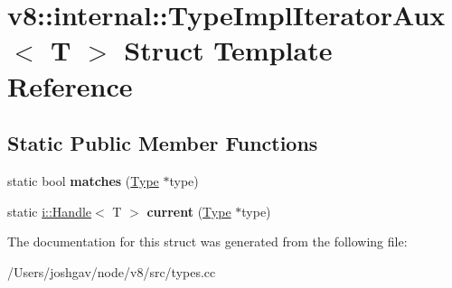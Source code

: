 \hypertarget{structv8_1_1internal_1_1_type_impl_iterator_aux}{}\section{v8\+:\+:internal\+:\+:Type\+Impl\+Iterator\+Aux$<$ T $>$ Struct Template Reference}
\label{structv8_1_1internal_1_1_type_impl_iterator_aux}
\subsection*{Static Public Member Functions}
\begin{DoxyCompactItemize}
\item 
static bool {\bfseries matches} (\hyperlink{classv8_1_1internal_1_1_type}{Type} $\ast$type)\hypertarget{structv8_1_1internal_1_1_type_impl_iterator_aux_a26e498899ff3d0c8dcfd25aaa6b6c1ac}{}\label{structv8_1_1internal_1_1_type_impl_iterator_aux_a26e498899ff3d0c8dcfd25aaa6b6c1ac}

\item 
static \hyperlink{classv8_1_1internal_1_1_handle}{i\+::\+Handle}$<$ T $>$ {\bfseries current} (\hyperlink{classv8_1_1internal_1_1_type}{Type} $\ast$type)\hypertarget{structv8_1_1internal_1_1_type_impl_iterator_aux_a0e2294563fc03ca21265cd5cac2937d7}{}\label{structv8_1_1internal_1_1_type_impl_iterator_aux_a0e2294563fc03ca21265cd5cac2937d7}

\end{DoxyCompactItemize}


The documentation for this struct was generated from the following file\+:\begin{DoxyCompactItemize}
\item 
/\+Users/joshgav/node/v8/src/types.\+cc\end{DoxyCompactItemize}
